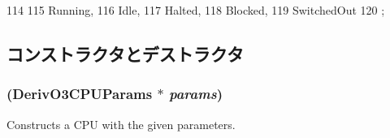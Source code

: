\begin{DoxyCode}
114                 {
115         Running,
116         Idle,
117         Halted,
118         Blocked,
119         SwitchedOut
120     };
\end{DoxyCode}


\subsection{コンストラクタとデストラクタ}
\hypertarget{classFullO3CPU_aa8d6265cca6a8e1449d64b99483b1ecc}{
\subsubsection[{FullO3CPU}]{ (DerivO3CPUParams $\ast$ {\em params})}}
\label{classFullO3CPU_aa8d6265cca6a8e1449d64b99483b1ecc}
Constructs a CPU with the given parameters. 


